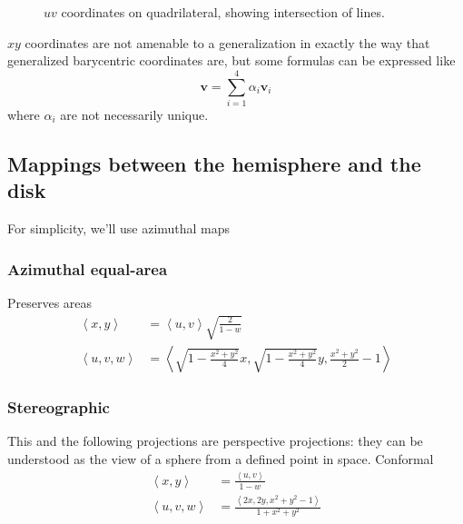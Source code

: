 \documentclass{amsart}[12pt]
\begin{document}
\begin{figure}%
\caption{$uv$ coordinates on quadrilateral, showing intersection of lines.}
\label{fig:uv}
\end{figure}

$xy$ coordinates are not amenable to a generalization in exactly the way that
generalized barycentric coordinates are, but some formulas can be expressed like
\begin{equation}
  \mathbf v = \sum^4_{i=1} \alpha_i \mathbf v_i
\end{equation}
where $\alpha_i$ are not necessarily unique.

\subsection{Mappings between the hemisphere and the disk}

For simplicity, we'll use azimuthal maps\cite{snyder}

\subsubsection{Azimuthal equal-area}
Preserves areas
\begin{equation}\begin{split}
  \left<x, y\right> &= \left<u, v\right> \sqrt{\frac{2}{1-w}} \\
  \left<u, v, w\right> &= \left<\sqrt{1- \frac{x^2+y^2}{4}}x,
    \sqrt{1- \frac{x^2+y^2}{4}}y, \frac{x^2+y^2}{2}-1\right>
\end{split}\end{equation}

\subsubsection{Stereographic}
This and the following projections are perspective projections: they can be
understood as the view of a sphere from a defined point in space.
Conformal
\begin{equation}\begin{split}
  \left<x, y\right> &= \frac{\left<u, v\right>}{1-w} \\
  \left<u, v, w\right> &= \frac{\left<2x, 2y, x^2+y^2-1\right>}{1+x^2+y^2}
\end{split}\end{equation}
\end{document}
